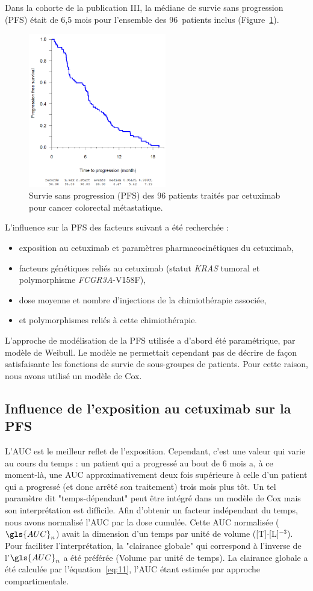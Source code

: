 Dans la cohorte de la publication III, la médiane de survie sans progression (PFS) était de 6,5 mois pour l'ensemble des 96~patients inclus (Figure~\ref{fig:23}). 
\begin{figure}[htbp]
	\centering
		\includegraphics[width=6cm]{figures/raster/FIG_23}
	\caption[PFS de 96 patients]{Survie sans progression (PFS) des 96 patients traités par cetuximab pour cancer colorectal métastatique.}
	\label{fig:23}
\end{figure}
L'influence sur la PFS des facteurs suivant a été recherchée :
\begin{itemize}
\item exposition au cetuximab et paramètres pharmacocinétiques du cetuximab,
\item facteurs génétiques reliés au cetuximab (statut \textit{KRAS} tumoral et polymorphisme \textit{FCGR3A}-V158F),
\item dose moyenne et nombre d'injections de la chimiothérapie associée,
\item et polymorphismes reliés à cette chimiothérapie.
\end{itemize}
L'approche de modélisation de la PFS utilisée a d'abord été paramétrique, par modèle de Weibull. Le modèle ne permettait cependant pas de décrire de façon satisfaisante les fonctions de survie de sous-groupes de patients. Pour cette raison, nous avons utilisé un modèle de Cox.
\subsection{Influence de l'exposition au cetuximab sur la PFS}
L'\gls{AUC} est le meilleur reflet de l'exposition. Cependant, c'est une valeur qui varie au cours du temps : un patient qui a progressé au bout de 6 mois a, à ce moment-là, une \gls{AUC} approximativement deux fois supérieure à celle d'un patient qui a progressé (et donc arrêté son traitement) trois mois plus tôt. Un tel paramètre dit "temps-dépendant" peut être intégré dans un modèle de Cox mais son interprétation est difficile. Afin d'obtenir un facteur indépendant du temps, nous avons normalisé l'\gls{AUC} par la dose cumulée. Cette \gls{AUC} normalisée ($\gls{AUC}_n$) avait la dimension d'un temps par unité de volume ([T]$\cdot$[L]$^{-3}$). Pour faciliter l'interprétation, la "clairance globale" qui correspond à l'inverse de l'$\gls{AUC}_n$ a été préférée (Volume par unité de temps). La clairance globale a été calculée par l'équation~\ref{eq:11}, l'\gls{AUC} étant estimée par approche compartimentale.

